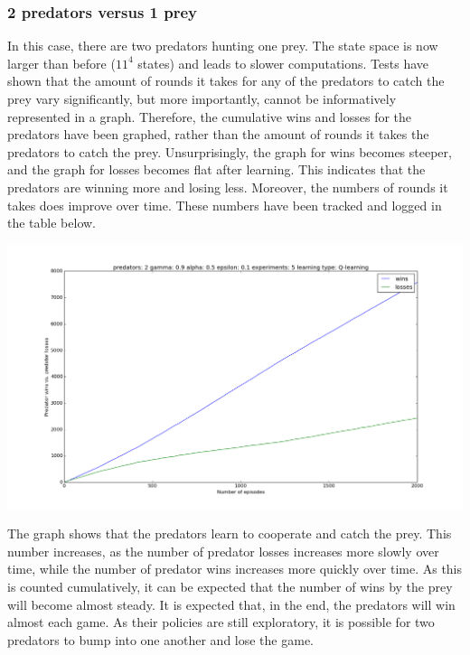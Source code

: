 \subsubsection{2 predators versus 1 prey}
In this case, there are two predators hunting one prey. The state space is now larger than before ($11^4$ states) and leads to slower computations. Tests have shown that the amount of rounds it takes for any of the predators to catch the prey vary significantly, but more importantly, cannot be informatively represented in a graph. Therefore, the cumulative wins and losses for the predators have been graphed, rather than the amount of rounds it takes the predators to catch the prey. Unsurprisingly, the graph for wins becomes steeper, and the graph for losses becomes flat after learning. This indicates that the predators are winning more and losing less. Moreover, the numbers of rounds it takes does improve over time. These numbers have been tracked and logged in the table below.

\begin{center}
	\includegraphics[scale=0.3]{2_predators_q_learning}
\end{center}

The graph shows that the predators learn to cooperate and catch the prey. This number increases, as the number of predator losses increases more slowly over time, while the number of predator wins increases more quickly over time. As this is counted cumulatively, it can be expected that the number of wins by the prey will become almost steady. It is expected that, in the end, the predators will win almost each game. As their policies are still exploratory, it is possible for two predators to bump into one another and lose the game.

